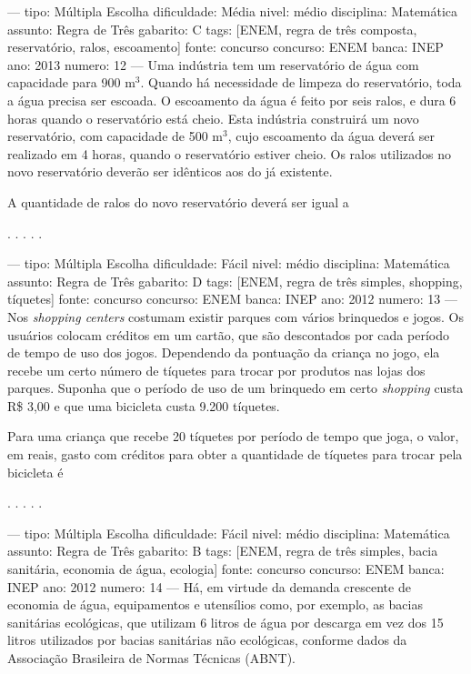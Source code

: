 ---
tipo: Múltipla Escolha
dificuldade: Média
nivel: médio
disciplina: Matemática
assunto: Regra de Três
gabarito: C
tags: [ENEM, regra de três composta, reservatório, ralos, escoamento]
fonte: concurso
concurso: ENEM
banca: INEP
ano: 2013
numero: 12
---
\question
Uma indústria tem um reservatório de água com capacidade para 900 m$^3$. Quando há necessidade de limpeza do reservatório, toda a água precisa ser escoada. O escoamento da água é feito por seis ralos, e dura 6 horas quando o reservatório está cheio. Esta indústria construirá um novo reservatório, com capacidade de 500 m$^3$, cujo escoamento da água deverá ser realizado em 4 horas, quando o reservatório estiver cheio. Os ralos utilizados no novo reservatório deverão ser idênticos aos do já existente.

A quantidade de ralos do novo reservatório deverá ser igual a
\begin{choices}
.
.
.
.
.
\end{choices}

---
tipo: Múltipla Escolha
dificuldade: Fácil
nivel: médio
disciplina: Matemática
assunto: Regra de Três
gabarito: D
tags: [ENEM, regra de três simples, shopping, tíquetes]
fonte: concurso
concurso: ENEM
banca: INEP
ano: 2012
numero: 13
---
\question
Nos \textit{shopping centers} costumam existir parques com vários brinquedos e jogos. Os usuários colocam créditos em um cartão, que são descontados por cada período de tempo de uso dos jogos. Dependendo da pontuação da criança no jogo, ela recebe um certo número de tíquetes para trocar por produtos nas lojas dos parques. Suponha que o período de uso de um brinquedo em certo \textit{shopping} custa R\$ 3,00 e que uma bicicleta custa 9.200 tíquetes.

Para uma criança que recebe 20 tíquetes por período de tempo que joga, o valor, em reais, gasto com créditos para obter a quantidade de tíquetes para trocar pela bicicleta é
\begin{choices}
.
.
.
.
.
\end{choices}

---
tipo: Múltipla Escolha
dificuldade: Fácil
nivel: médio
disciplina: Matemática
assunto: Regra de Três
gabarito: B
tags: [ENEM, regra de três simples, bacia sanitária, economia de água, ecologia]
fonte: concurso
concurso: ENEM
banca: INEP
ano: 2012
numero: 14
---
\question
Há, em virtude da demanda crescente de economia de água, equipamentos e utensílios como, por exemplo, as bacias sanitárias ecológicas, que utilizam 6 litros de água por descarga em vez dos 15 litros utilizados por bacias sanitárias não ecológicas, conforme dados da Associação Brasileira de Normas Técnicas (ABNT).

